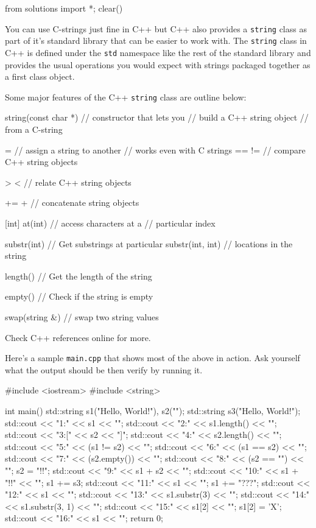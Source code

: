 \begin{python0}
from solutions import *; clear()
\end{python0}

You can use C-strings just fine in C++ but C++ also provides a
\texttt{string} class as part of it's standard library
that can be easier to work with. The \texttt{string} class in C++ is
defined under the \texttt{std} namespace like the rest of the standard
library and provides the usual operations you would expect with strings
packaged together as a first class object.

Some major features of the C++ \texttt{string} class are outline below:
\begin{console}
string(const char *)    // constructor that lets you
                        // build a C++ string object
                        // from a C-string

=                       // assign a string to another
                        // works even with C strings
==     !=               // compare C++ string objects

>      <                // relate C++ string objects

+=     +                // concatenate string objects

[int]  at(int)          // access characters at a
                        // particular index

substr(int)             // Get substrings at particular
substr(int, int)        // locations in the string

length()                // Get the length of the string

empty()                 // Check if the string is empty

swap(string &)          // swap two string values\
\end{console}

Check C++ references online for more.

Here's a sample \texttt{main.cpp} that shows most of the
above in action. Ask yourself what the output should be then verify by
running it.

\begin{console}
#include <iostream>
#include <string>

int main()
{   
    std::string s1("Hello, World!"), s2("");
    std::string s3("Hello, World!");
    std::cout << "1:" << s1 << "\n";
    std::cout << "2:" << s1.length() << "\n";
    std::cout << "3:[" << s2 << "]\n";
    std::cout << "4:" << s2.length() << "\n";
    std::cout << "5:" << (s1 != s2) << "\n";
    std::cout << "6:" << (s1 == s2) << "\n";
    std::cout << "7:" << (s2.empty()) << "\n";
    std::cout << "8:" << (s2 == "") << "\n";
    s2 = "!!";
    std::cout << "9:" << s1 + s2 << "\n";
    std::cout << "10:" << s1 + "!!" << "\n";
    s1 += s3;
    std::cout << "11:" << s1 << "\n";
    s1 += "???";
    std::cout << "12:" << s1 << "\n";
    std::cout << "13:" << s1.substr(3) << "\n";
    std::cout << "14:" << s1.substr(3, 1) << "\n";
    std::cout << "15:" << s1[2] << "\n";
    s1[2] = 'X';
    std::cout << "16:" << s1 << "\n";
    return 0;
}
\end{console}

